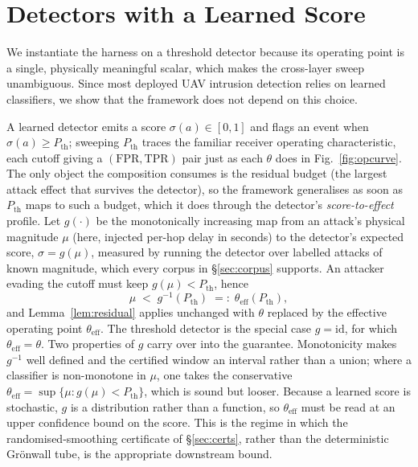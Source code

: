 \section{Detectors with a Learned Score}
\label{app:learned}
\label{sec:roc}
We instantiate the harness on a threshold detector because its operating point
is a single, physically meaningful scalar, which makes the cross-layer sweep
unambiguous. Since most deployed UAV intrusion detection relies on learned
classifiers, we show that the framework does not depend on this choice.

A learned detector emits a score $\sigma(a)\in[0,1]$ and flags an event when
$\sigma(a)\ge P_{\mathrm{th}}$; sweeping $P_{\mathrm{th}}$ traces the familiar
receiver operating characteristic, each cutoff giving a
$(\mathrm{FPR},\mathrm{TPR})$ pair just as each $\theta$ does in
Fig.~\ref{fig:opcurve}. The only object the composition consumes is the residual
budget (the largest attack effect that survives the detector), so the framework
generalises as soon as $P_{\mathrm{th}}$ maps to such a budget, which it does
through the detector's \emph{score-to-effect} profile. Let $g(\cdot)$ be the
monotonically increasing map from an attack's physical magnitude $\mu$ (here,
injected per-hop delay in seconds) to the detector's expected score,
$\sigma=g(\mu)$, measured by running the detector over labelled attacks of known
magnitude, which every corpus in \S\ref{sec:corpus} supports. An attacker
evading the cutoff must keep $g(\mu)<P_{\mathrm{th}}$, hence
\begin{equation}
\label{eq:pth}
\mu \;<\; g^{-1}(P_{\mathrm{th}}) \;=:\; \theta_{\mathrm{eff}}(P_{\mathrm{th}}),
\end{equation}
and Lemma~\ref{lem:residual} applies unchanged with $\theta$ replaced by the
effective operating point $\theta_{\mathrm{eff}}$. The threshold detector is the
special case $g=\mathrm{id}$, for which $\theta_{\mathrm{eff}}=\theta$. Two
properties of $g$ carry over into the guarantee. Monotonicity makes $g^{-1}$
well defined and the certified window an interval rather than a union; where a
classifier is non-monotone in $\mu$, one takes the conservative
$\theta_{\mathrm{eff}}=\sup\{\mu: g(\mu)<P_{\mathrm{th}}\}$, which is sound but
looser. Because a learned score is stochastic, $g$ is a
distribution rather than a function, so $\theta_{\mathrm{eff}}$ must be read at
an upper confidence bound on the score. This is the regime in which the
randomised-smoothing certificate of \S\ref{sec:certs}, rather than the
deterministic Gr\"onwall tube, is the appropriate downstream bound.

